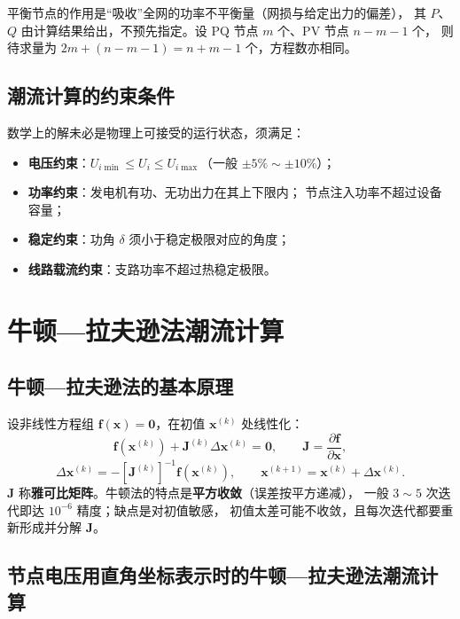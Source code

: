 平衡节点的作用是“吸收”全网的功率不平衡量（网损与给定出力的偏差），
其 $P$、$Q$ 由计算结果给出，不预先指定。设 PQ 节点 $m$ 个、PV 节点 $n-m-1$ 个，
则待求量为 $2m+(n-m-1)=n+m-1$ 个，方程数亦相同。

\subsection{潮流计算的约束条件}

数学上的解未必是物理上可接受的运行状态，须满足：
\begin{itemize}
  \item \textbf{电压约束}：$U_{i\min}\le U_i\le U_{i\max}$（一般 $\pm5\%\sim\pm10\%$）；
  \item \textbf{功率约束}：发电机有功、无功出力在其上下限内；
        节点注入功率不超过设备容量；
  \item \textbf{稳定约束}：功角 $\delta$ 须小于稳定极限对应的角度；
  \item \textbf{线路载流约束}：支路功率不超过热稳定极限。
\end{itemize}

\section{牛顿—拉夫逊法潮流计算}

\subsection{牛顿—拉夫逊法的基本原理}

设非线性方程组 $\boldsymbol f(\boldsymbol x)=\boldsymbol 0$，在初值 $\boldsymbol x^{(k)}$ 处线性化：
\begin{equation}
  \boldsymbol f\left(\boldsymbol x^{(k)}\right)+\boldsymbol J^{(k)}\Delta\boldsymbol x^{(k)}=\boldsymbol 0,
  \qquad \boldsymbol J=\frac{\partial\boldsymbol f}{\partial\boldsymbol x},
\end{equation}
\begin{equation}
  \Delta\boldsymbol x^{(k)}=-\left[\boldsymbol J^{(k)}\right]^{-1}\boldsymbol f\left(\boldsymbol x^{(k)}\right),
  \qquad \boldsymbol x^{(k+1)}=\boldsymbol x^{(k)}+\Delta\boldsymbol x^{(k)}.
\end{equation}
$\boldsymbol J$ 称\textbf{雅可比矩阵}。牛顿法的特点是\textbf{平方收敛}（误差按平方递减），
一般 $3\sim5$ 次迭代即达 $10^{-6}$ 精度；缺点是对初值敏感，
初值太差可能不收敛，且每次迭代都要重新形成并分解 $\boldsymbol J$。

\subsection{节点电压用直角坐标表示时的牛顿—拉夫逊法潮流计算}

